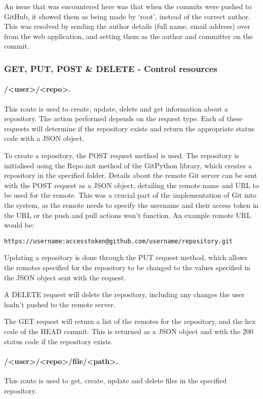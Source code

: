 	An issue that was encountered here was that when the commits were pushed to GitHub, it showed them as being made by `root', instead of the correct author. This was resolved by sending the author details (full name, email address) over from the web application, and setting them as the author and committer on the commit.
	
	\subsubsection{GET, PUT, POST \& DELETE - Control resources}
	
	\paragraph{/<user>/<repo>.}
	This route is used to create, update, delete and get information about a repository. The action performed depends on the request type. Each of these requests will determine if the repository exists and return the appropriate status code with a JSON object.

	To create a repository, the POST request method is used. The repository is initialised using the Repo.init method of the GitPython library, which creates a repository in the specified folder. Details about the remote Git server can be sent with the POST request as a JSON object, detailing the remote name and URL to be used for the remote. This was a crucial part of the implementation of Git into the system, as the remote needs to specify the username and their access token in the URL or the push and pull actions won't function.  An example remote URL would be:

	\begin{lstlisting}
https://username:accesstoken@github.com/username/repository.git\end{lstlisting}

	Updating a repository is done through the PUT request method, which allows the remotes specified for the repository to be changed to the values specified in the JSON object sent with the request.

	A DELETE request will delete the repository, including any changes the user hadn't pushed to the remote server.

	The GET request will return a list of the remotes for the repository, and the hex code of the HEAD commit. This is returned as a JSON object and with the 200 status code if the repository exists.

	\paragraph{/<user>/<repo>/file/<path>.}
	This route is used to get, create, update and delete files in the specified repository.

